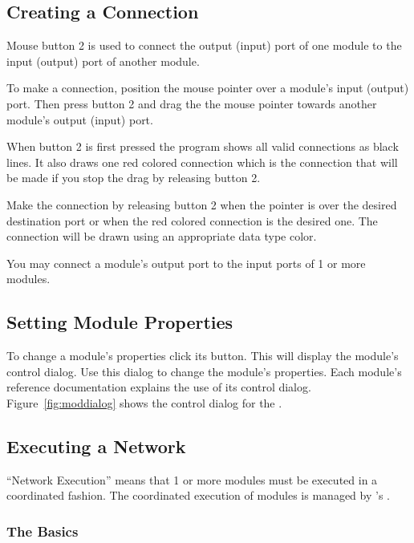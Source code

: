 \subsection{Creating a Connection}
\label{sec:connectmods}

Mouse button 2 is used to connect the output (input) port of one module to the
input (output) port of another module.  

To make a connection, position the mouse pointer over a module's input
(output) port.  Then press button 2 and drag the the mouse pointer towards
another module's output (input) port.

When button 2 is first pressed the program shows all valid connections as
black lines.  It also draws one red colored connection which is the
connection that will be made if you stop the drag by releasing 
button 2.

Make the connection by releasing button 2 when the pointer is over
the desired destination port or when the red colored connection is the
desired one.  The connection will be drawn using an appropriate data type
color.

You may connect a module's output port to the input ports of 1 or more
modules.

\subsection{Setting Module Properties}
\label{sec:setmodprops}

To change a module's properties click its  button.  This will
display the module's control dialog.  Use this dialog to change the
module's properties.  Each module's reference documentation explains the
use of its control dialog.  Figure~\ref{fig:moddialog} shows the control
dialog for the .

\subsection{Executing a Network}
\label{sec:executenet}

``Network Execution'' means that 1 or more modules must be executed in a
coordinated fashion. The coordinated execution of modules is managed by
\sr{}'s .

\subsubsection{The Basics}

